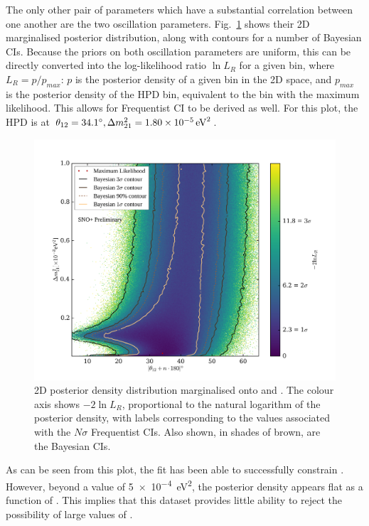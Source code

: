 The only other pair of parameters which have a substantial correlation between one another are the two oscillation parameters. Fig.~\ref{fig:2d_osc_param_posterior} shows their 2D marginalised posterior distribution, along with contours for a number of Bayesian CIs. Because the priors on both oscillation parameters are uniform, this can be directly converted into the log-likelihood ratio $\ln{L_{R}}$ for a given bin, where $L_{R} = p/p_{max}$: $p$ is the posterior density of a given bin in the 2D space, and $p_{max}$ is the posterior density of the HPD bin, equivalent to the bin with the maximum likelihood. This allows for Frequentist CI to be derived as well. For this plot, the HPD is at $\tonetwo{} = \ang{34.1}, \dmsq{} = \SI{1.80e-5}{\eV\squared}$.

\begin{figure}[!th]
    \centering
    \includegraphics[width=\textwidth]{6_SolarAnalysis/images/steve_style_contours.png}
    \caption[2D posterior density distribution marginalised onto \dmsq{} and \tonetwo{}]
    {2D posterior density distribution marginalised onto \dmsq{} and \tonetwo{}. The colour axis shows $-2\ln{L_{R}}$, proportional to the natural logarithm of the posterior density, with labels corresponding to the values associated with the $N\sigma$ Frequentist CIs. Also shown, in shades of brown, are the Bayesian CIs.}
    \label{fig:2d_osc_param_posterior}
\end{figure}

As can be seen from this plot, the fit has been able to successfully constrain \tonetwo{}. However, beyond a value of \SI{5e-4}{\eV\squared}, the posterior density appears flat as a function of \dmsq{}. This implies that this dataset provides little ability to reject the possibility of large values of \dmsq{}.

